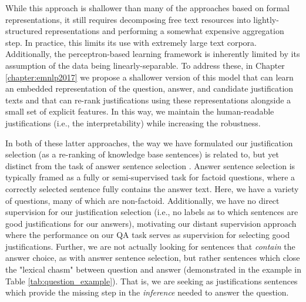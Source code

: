 While this approach is shallower than many of the approaches based on formal representations, it still requires decomposing free text resources into lightly-structured representations and performing a somewhat expensive aggregation step.  In practice, this limits its use with extremely large text corpora.  Additionally, the perceptron-based learning framework is inherently limited by its assumption of the data being linearly-separable.  To address these, in Chapter \ref{chapter:emnlp2017} we propose a shallower version of this model that can learn an embedded representation of the question, answer, and candidate justification texts and that can re-rank justifications using these representations alongside a small set of explicit features.  In this way, we maintain the human-readable justifications (i.e., the interpretability) while increasing the robustness.

In both of these latter approaches, the way we have formulated our justification selection (as a re-ranking of knowledge base sentences) is related to, but yet distinct from the task of answer sentence selection \cite[][inter alia]{Wang2010ProbabilisticTM, Severyn:12,Severyn:13a,Severyn:13b,Severyn2015LearningTR,wang2015long}.  Answer sentence selection is typically framed as a fully or semi-supervised task for factoid questions, where a correctly selected sentence fully contains the answer text.
Here, we have a variety of questions, many of which are non-factoid.  Additionally, we have no direct supervision for our justification selection (i.e., no labels as to which sentences are good justifications for our answers), motivating our distant supervision approach where the performance on our QA task serves as supervision for selecting good justifications.  Further, we are not actually looking for sentences that \emph{contain} the answer choice, as with answer sentence selection, but rather sentences which close the "lexical chasm" \citep{Berger:00} between question and answer (demonstrated in the example in Table \ref{tab:question_example}).  That is, we are seeking as justifications sentences which provide the missing step in the \emph{inference} needed to answer the question.
